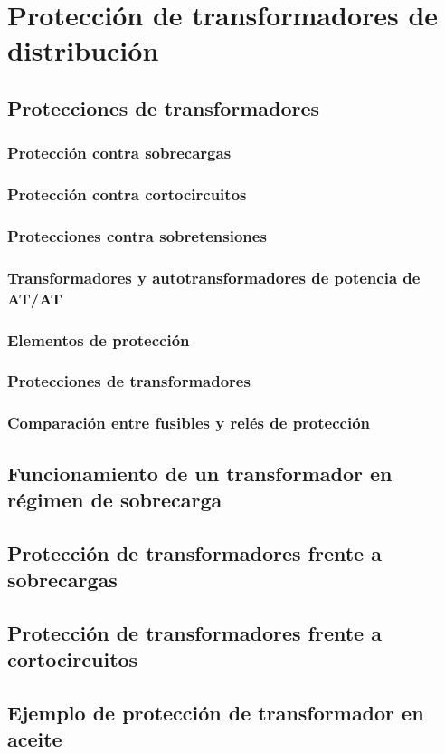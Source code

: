 \chapter{Protección de transformadores de distribución}
\section{Protecciones de transformadores}
\subsection{Protección contra sobrecargas}
\subsection{Protección contra cortocircuitos}
\subsection{Protecciones contra sobretensiones}
\subsection{Transformadores y autotransformadores de potencia de AT/AT}
\subsection{Elementos de protección}
\subsection{Protecciones de transformadores}
\subsection{Comparación entre fusibles y relés de protección}
\section{Funcionamiento de un transformador en régimen de sobrecarga}
\section{Protección de transformadores frente a sobrecargas}
\section{Protección de transformadores frente a cortocircuitos}
\section{Ejemplo de protección de transformador en aceite}